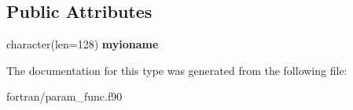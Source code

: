 \subsection*{Public Attributes}
\begin{DoxyCompactItemize}
\item 
\mbox{\label{structparam__func__mod_1_1genericparamobj_ab3b766bba0fb381e51e587c8ad832c61}} 
character(len=128) {\bfseries myioname}
\end{DoxyCompactItemize}


The documentation for this type was generated from the following file\+:\begin{DoxyCompactItemize}
\item 
fortran/param\+\_\+func.\+f90\end{DoxyCompactItemize}
